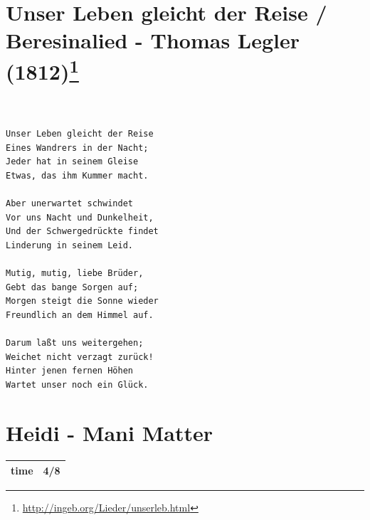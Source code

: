 \documentclass[
]{book}
\let\stdsection\section
\renewcommand\section{\clearpage\stdsection}
\begin{document}
\hypertarget{unser-leben-gleicht-der-reise-beresinalied---thomas-legler-18121}{%
\section[Unser Leben gleicht der Reise / Beresinalied - Thomas Legler (1812)]{\texorpdfstring{Unser Leben gleicht der Reise / Beresinalied - Thomas Legler (1812)\footnote{\url{http://ingeb.org/Lieder/unserleb.html}}}{Unser Leben gleicht der Reise / Beresinalied - Thomas Legler (1812)}}\label{unser-leben-gleicht-der-reise-beresinalied---thomas-legler-18121}}

\begin{verbatim}


Unser Leben gleicht der Reise
Eines Wandrers in der Nacht;
Jeder hat in seinem Gleise
Etwas, das ihm Kummer macht.

Aber unerwartet schwindet
Vor uns Nacht und Dunkelheit,
Und der Schwergedrückte findet
Linderung in seinem Leid. 

Mutig, mutig, liebe Brüder,
Gebt das bange Sorgen auf;
Morgen steigt die Sonne wieder
Freundlich an dem Himmel auf.

Darum laßt uns weitergehen;
Weichet nicht verzagt zurück!
Hinter jenen fernen Höhen
Wartet unser noch ein Glück. 
\end{verbatim}

\hypertarget{heidi---mani-matter}{%
\section{Heidi - Mani Matter}\label{heidi---mani-matter}}

\begin{longtable}[]{@{}ll@{}}
\toprule
\endhead
time & 4/8\tabularnewline
\bottomrule
\end{longtable}
\end{document}
